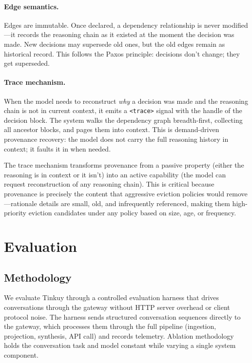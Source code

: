 \documentclass[sigplan,screen,anonymous]{acmart}
\begin{document}
\paragraph{Edge semantics.} Edges are immutable. Once declared, a
dependency relationship is never modified---it records the reasoning
chain as it existed at the moment the decision was made. New decisions
may supersede old ones, but the old edges remain as historical record.
This follows the Paxos principle: decisions don't change; they get
superseded.

\paragraph{Trace mechanism.} When the model needs to reconstruct
\emph{why} a decision was made and the reasoning chain is not in
current context, it emits a \texttt{<trace>} signal with the handle
of the decision block. The system walks the dependency graph
breadth-first, collecting all ancestor blocks, and pages them into
context. This is demand-driven provenance recovery: the model does
not carry the full reasoning history in context; it faults it in when
needed.

The trace mechanism transforms provenance from a passive property
(either the reasoning is in context or it isn't) into an active
capability (the model can request reconstruction of any reasoning
chain). This is critical because provenance is precisely the content
that aggressive eviction policies would remove---rationale details
are small, old, and infrequently referenced, making them high-priority
eviction candidates under any policy based on size, age, or frequency.


\section{Evaluation}

\subsection{Methodology}

We evaluate Tinkuy through a controlled evaluation harness that
drives conversations through the gateway without HTTP server overhead
or client protocol noise. The harness sends structured conversation
sequences directly to the gateway, which processes them through the
full pipeline (ingestion, projection, synthesis, API call) and records
telemetry. Ablation methodology holds the conversation task and model
constant while varying a single system component.
\end{document}
